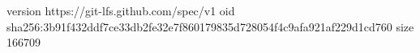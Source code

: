 version https://git-lfs.github.com/spec/v1
oid sha256:3b91f432ddf7ce33db2fe32e7f860179835d728054f4c9afa921af229d1cd760
size 166709

